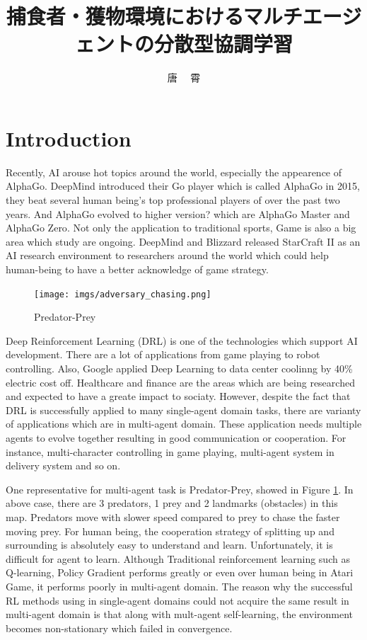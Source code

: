 \documentclass[11pt,twocolumn]{jarticle} %
\title{捕食者・獲物環境におけるマルチエージェントの分散型協調学習}
\author{唐 \ \ 霄}
\begin{document}
\maketitle
\thispagestyle{iitheader}
\section{Introduction}
Recently, AI arouse hot topics around the world, especially the appearence of AlphaGo\cite{alphago}. DeepMind introduced their Go player which is called AlphaGo in 2015, they beat several human being's top professional players of over the past two years. And AlphaGo evolved to higher version? which are AlphaGo Master and AlphaGo Zero\cite{alphagozero}. Not only the application to traditional sports, Game is also a big area which study are ongoing. DeepMind and Blizzard released StarCraft II as an AI research environment\cite{starcraft} to researchers around the world which could help human-being to have a better acknowledge of game strategy.\par

\begin{figure}[t]
 \begin{center}
  \texttt{[image: imgs/adversary\_chasing.png]}
  \caption{Predator-Prey}
  \label{fig:adversaryChasing}
 \end{center}
\end{figure}

Deep Reinforcement Learning (DRL) is one of the technologies which support AI development. There are a lot of applications from game playing\cite{game} to robot controlling\cite{robot}. Also, Google applied Deep Learning to data center coolinng by 40\%\cite{google} electric cost off. Healthcare and finance are the areas which are being researched and expected to have a greate impact to sociaty. However, despite the fact that DRL is successfully applied to many single-agent domain tasks, there are varianty of applications which are in multi-agent domain. These application needs multiple agents to evolve together resulting in good communication or cooperation. For instance, multi-character controlling in game playing, multi-agent system in delivery system and so on.


One representative for multi-agent task is Predator-Prey\cite{maddpg}, showed in Figure \ref{fig:adversaryChasing}. In above case, there are 3 predators, 1 prey and 2 landmarks (obstacles) in this map. Predators move with slower speed compared to prey to chase the faster moving prey. For human being, the cooperation strategy of splitting up and surrounding is absolutely easy to understand and learn. Unfortunately, it is difficult for agent to learn. Although Traditional reinforcement learning such as Q-learning\cite{qlearning}, Policy Gradient\cite{pg} performs greatly or even over human being in Atari Game\cite{ddpg}, it performs poorly in multi-agent domain. The reason why the successful RL methods using in single-agent domains could not acquire the same result in multi-agent domain is that along with mult-agent self-learning, the environment becomes non-stationary which failed in convergence. \par
\end{document}
